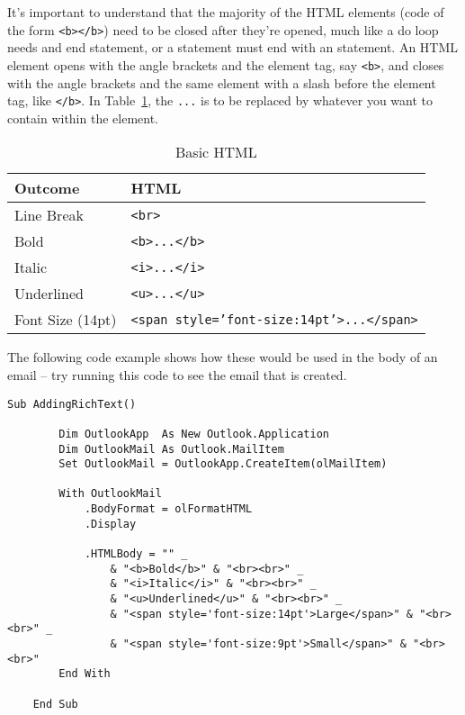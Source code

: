 \documentclass[11pt]{article}%
\begin{document}
It's important to understand that the majority of the HTML elements (code of the form \texttt{<b></b>}) need to be closed after they're opened, much like a do loop needs and end statement, or a \texttt{} statement must end with an \texttt{} statement. An HTML element opens with the angle brackets and the element tag, say \texttt{<b>}, and closes with the angle brackets and the same element with a slash before the element tag, like \texttt{</b>}. In Table~\ref{tab:BasicHTML}, the \texttt{...} is to be replaced by whatever you want to contain within the element.

\begin{table}[ht]
    \centering
    \begin{tabular}{l|l}
        Outcome          & HTML\\\hline
        Line Break       & \texttt{<br>}\\
        Bold             & \texttt{<b>...</b>}\\
        Italic           & \texttt{<i>...</i>}\\
        Underlined       & \texttt{<u>...</u>}\\
        Font Size (14pt) & \texttt{<span style='font-size:14pt'>...</span>}\\
    \end{tabular}
    \caption{Basic HTML}
    \label{tab:BasicHTML}
\end{table}

The following code example shows how these would be used in the body of an email -- try running this code to see the email that is created.\\

\begin{lstlisting}[style=A]
    Sub AddingRichText()

        Dim OutlookApp  As New Outlook.Application
        Dim OutlookMail As Outlook.MailItem
        Set OutlookMail = OutlookApp.CreateItem(olMailItem)

        With OutlookMail
            .BodyFormat = olFormatHTML
            .Display

            .HTMLBody = "" _
                & "<b>Bold</b>" & "<br><br>" _
                & "<i>Italic</i>" & "<br><br>" _
                & "<u>Underlined</u>" & "<br><br>" _
                & "<span style='font-size:14pt'>Large</span>" & "<br><br>" _
                & "<span style='font-size:9pt'>Small</span>" & "<br><br>"
        End With

    End Sub
\end{lstlisting}
\end{document}
